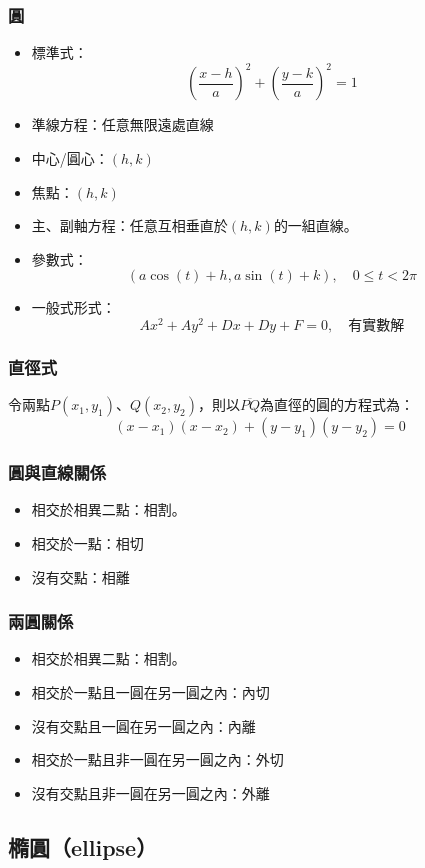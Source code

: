 \documentclass[a4paper,12pt]{article}
\begin{document}
\subsubsection{圓}
\begin{itemize}
\item 標準式：
\[\left(\frac{x-h}{a}\right)^2+\left(\frac{y-k}{a}\right)^2=1\]
\item 準線方程：任意無限遠處直線
\item 中心/圓心：$(h,k)$
\item 焦點：$(h,k)$
\item 主、副軸方程：任意互相垂直於$(h,k)$的一組直線。
\item 參數式：
\[(a\cos(t)+h,a\sin(t)+k),\quad0\leq t<2\pi\]
\item 一般式形式：
\[Ax^2+Ay^2+Dx+Dy+F=0,\quad\text{有實數解}\]
\end{itemize}
\subsubsection{直徑式}
令兩點$P(x_1,y_1)$、$Q(x_2,y_2)$，則以$\overline{PQ}$為直徑的圓的方程式為：
\[(x-x_1)(x-x_2)+(y-y_1)(y-y_2)=0\]
\subsubsection{圓與直線關係}
\begin{itemize}
\item 相交於相異二點：相割。
\item 相交於一點：相切
\item 沒有交點：相離
\end{itemize}
\subsubsection{兩圓關係}
\begin{itemize}
\item 相交於相異二點：相割。
\item 相交於一點且一圓在另一圓之內：內切
\item 沒有交點且一圓在另一圓之內：內離
\item 相交於一點且非一圓在另一圓之內：外切
\item 沒有交點且非一圓在另一圓之內：外離
\end{itemize}
\subsection{橢圓（ellipse）}
\end{document}
